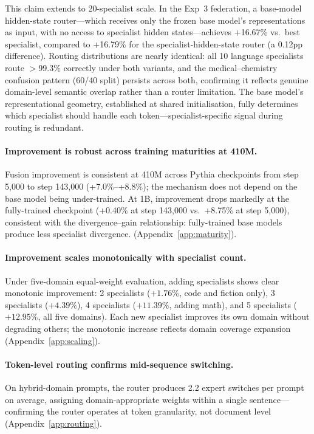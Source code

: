 \documentclass{article}
\begin{document}
This claim extends to 20-specialist scale. In the Exp~3 federation, a base-model hidden-state router---which receives only the frozen base model's representations as input, with no access to specialist hidden states---achieves +16.67\% vs.\ best specialist, compared to +16.79\% for the specialist-hidden-state router (a 0.12pp difference). Routing distributions are nearly identical: all 10 language specialists route ${>}$99.3\% correctly under both variants, and the medical--chemistry confusion pattern (60/40 split) persists across both, confirming it reflects genuine domain-level semantic overlap rather than a router limitation. The base model's representational geometry, established at shared initialisation, fully determines which specialist should handle each token---specialist-specific signal during routing is redundant.

\paragraph{Improvement is robust across training maturities at 410M.} Fusion improvement is consistent at 410M across Pythia checkpoints from step 5,000 to step 143,000 (+7.0\%--+8.8\%); the mechanism does not depend on the base model being under-trained. At 1B, improvement drops markedly at the fully-trained checkpoint (+0.40\% at step 143,000 vs.\ +8.75\% at step 5,000), consistent with the divergence--gain relationship: fully-trained base models produce less specialist divergence. (Appendix~\ref{app:maturity}).

\paragraph{Improvement scales monotonically with specialist count.} Under five-domain equal-weight evaluation, adding specialists shows clear monotonic improvement: 2 specialists ($+1.76\%$, code and fiction only), 3 specialists ($+4.39\%$), 4 specialists ($+11.39\%$, adding math), and 5 specialists ($+12.95\%$, all five domains). Each new specialist improves its own domain without degrading others; the monotonic increase reflects domain coverage expansion (Appendix~\ref{app:scaling}).

\paragraph{Token-level routing confirms mid-sequence switching.} On hybrid-domain prompts, the router produces 2.2 expert switches per prompt on average, assigning domain-appropriate weights within a single sentence---confirming the router operates at token granularity, not document level (Appendix~\ref{app:routing}).
\end{document}
